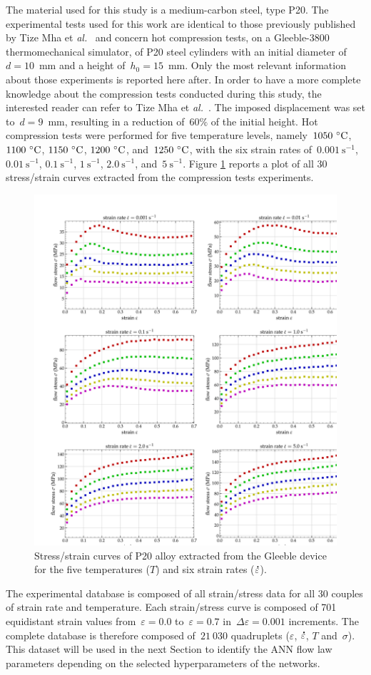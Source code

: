 \documentclass[algorithms,article,submit,pdftex,oneauthors]{Definitions/mdpi}
\makeatletter
\DeclareRobustCommand{\mdot}[1]{\accentset{\mbox{\bfseries .}}{#1}}
\DeclareRobustCommand{\eal}{et \emph{al.}\@\xspace}
\DeclareRobustCommand{\ps}{\text{s}^{-1}}
\makeatother
\begin{document}
The material used for this study is a medium-carbon steel, type P20.
The experimental tests used for this work are identical to those previously published by Tize Mha \eal~\cite{Tize-2023-IEP} and concern hot compression tests, on a Gleeble-3800 thermomechanical simulator, of P20 steel cylinders with an initial diameter of~$d=10$~mm and a height of~$h_0=15$~mm.
Only the most relevant information about those experiments is reported here after.
In order to have a more complete knowledge about the compression tests conducted during this study, the interested reader can refer to Tize Mha \eal~\cite{Tize-2023-IEP}.
The imposed displacement was set to~$d=9$~mm, resulting in a reduction of~$60\%$ of the initial height.
Hot compression tests were performed for five temperature levels, namely~$1050~\celsius$, $1100~\celsius$, $1150~\celsius$, $1200~\celsius$, and~$1250~\celsius$, with the six strain rates of~$0.001~\ps$, $0.01~\ps$, $0.1~\ps$, $1~\ps$, $2.0~\ps$, and~$5~\ps$.
Figure \ref{fig:RawData} reports a plot of all 30 stress/strain curves extracted from the compression tests experiments.
\begin{figure}[h]
\centering
\includegraphics[width=0.9\columnwidth]{Figures/3Cr2Mo-raw}
\caption{Stress/strain curves of P20 alloy extracted from the Gleeble device for the five temperatures ($T$) and six strain rates ($\mdot{\varepsilon}$).}
\label{fig:RawData}
\end{figure}
The experimental database is composed of all strain/stress data for all 30 couples of strain rate and temperature.
Each strain/stress curve is composed of 701 equidistant strain values from~$\varepsilon=0.0$ to~$\varepsilon=0.7$ in~$\Delta\varepsilon=0.001$ increments.
The complete database is therefore composed of~$21~030$ quadruplets ($\varepsilon$, $\mdot{\varepsilon}$, $T$ and~$\sigma$).
This dataset will be used in the next Section to identify the ANN flow law parameters depending on the selected hyperparameters of the networks.
\end{document}
